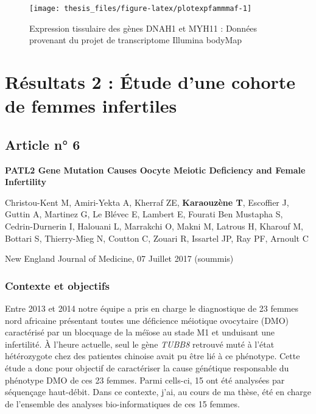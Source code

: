 \documentclass[12pt,twoside]{reedthesis}
\theoremstyle{definition}
\theoremstyle{definition}
\theoremstyle{remark}
\begin{document}
  \newpage
  
  \begin{figure}
  
  {\centering \texttt{[image: thesis\_files/figure-latex/plotexpfammmaf-1]} 
  
  }
  
  \caption[Expression tissulaire des gènes DNAH1 et MYH11]{Expression tissulaire des gènes DNAH1 et MYH11 : Données provenant du projet de transcriptome Illumina bodyMap}\label{fig:plotexpfammmaf}
  \end{figure}
  
  \newpage
  
  \section{Résultats 2 : Étude d'une cohorte de femmes
  infertiles}\label{resultats-2-etude-dune-cohorte-de-femmes-infertiles}
  
  \subsection{Article n° 6}\label{article-n-6}
  
  \textbf{PATL2 Gene Mutation Causes Oocyte Meiotic Deficiency and Female
  Infertility}
  
  Christou-Kent M, Amiri-Yekta A, Kherraf ZE, \textbf{Karaouzène T},
  Escoffier J, Guttin A, Martinez G, Le Blévec E, Lambert E, Fourati Ben
  Mustapha S, Cedrin-Durnerin I, Halouani L, Marrakchi O, Makni M, Latrous
  H, Kharouf M, Bottari S, Thierry-Mieg N, Coutton C, Zouari R, Issartel
  JP, Ray PF, Arnoult C
  
  New England Journal of Medicine, 07 Juillet 2017 (soummis)
  
  \newpage
  
  \subsubsection{Contexte et objectifs}\label{contexte-et-objectifs-3}
  
  Entre 2013 et 2014 notre équipe a pris en charge le diagnostique de 23
  femmes nord africaine présentant toutes une déficience méiotique
  ovocytaire (DMO) caractérisé par un blocquage de la méïose au stade M1
  et unduisant une infertilité. À l'heure actuelle, seul le gène
  \emph{TUBB8} retrouvé muté à l'état hétérozygote chez des patientes
  chinoise avait pu être lié à ce phénotype. Cette étude a donc pour
  objectif de caractériser la cause génétique responsable du phénotype DMO
  de ces 23 femmes. Parmi cells-ci, 15 ont été analysées par séquençage
  haut-débit. Dans ce contexte, j'ai, au cours de ma thèse, été en charge
  de l'ensemble des analyses bio-informatiques de ces 15 femmes.
  
\end{document}
